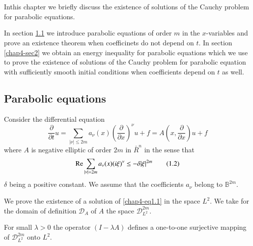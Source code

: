 \chapter{}\label{chap4} %

In\pageoriginale this chapter we briefly discuss the existence of
solutions of the Cauchy problem for parabolic equations.  

In section \ref{chap4-sec1} we introduce parabolic equations of order $m$ in the
$x$-variables and prove an existence theorem when  coefficinets do not
depend on $t$. In section \ref{chap4-sec2} we obtain an energy inequality for
parabolic equations which we use to prove the existence of solutions
of the Cauchy problem for parabolic equation with sufficiently smooth
initial conditions when coefficients depend on $t$ as well.  

\section{Parabolic equations}\label{chap4-sec1}%

Consider the differential equation 
\begin{equation*}
\frac{\partial}{\partial t} u =  \sum_{|\nu|\leq 2m} a_\nu (x)
\left(\frac{\partial}{\partial x }\right)^\nu u + f = A \left(x ,
\frac{\partial}{\partial x}\right) u + f \tag{1.1}\label{chap4-eq1.1}  
\end{equation*}
where $A$ is negative elliptic of order $2m$ in $\bar{R}^n$ in the
sense that  
\begin{equation*}
\operatorname{Re} \sum_{|\nu|=2m} a_\nu (x) (i \xi )^\nu \leq - \delta |\xi |^{2m}
\tag{1.2}  \label{chap4-eq1.2}
\end{equation*}
$\delta$ being a positive constant. We assume that the coefficients
$a_\nu$ belong to $\mathbb{B}^{2m}$.  

We prove the existence of a solution of \eqref{chap4-eq1.1} in the
space $L^2$. We 
take for the domain of definition $\mathscr{D}_A$ of $A$ the space
$\mathscr{D}^{ 2m }_{L^2}$.  

\setcounter{proposition}{0}
\begin{proposition}\label{chap4-sec1-prop1}%
For small $\lambda > 0 $ the operator $(I - \lambda A)$ defines a
one-to-one surjective mapping of $\mathscr{D}^{2m}_{ L^2}$ onto $L^2$.  
\end{proposition}

